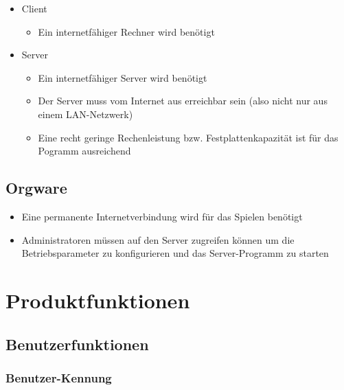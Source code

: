 \begin{itemize}
	\item Client
	\begin{itemize}
		\item Ein internetfähiger Rechner wird benötigt
	\end{itemize}
	\item Server
	\begin{itemize}
		\item Ein internetfähiger Server wird benötigt
		\item Der Server muss vom Internet aus erreichbar sein (also nicht nur aus einem LAN-Netzwerk)
		\item Eine recht geringe Rechenleistung bzw. Festplattenkapazität ist für das Pogramm ausreichend
	\end{itemize}
\end{itemize}

\section{Orgware}

\begin{itemize}
	\item Eine permanente Internetverbindung wird für das Spielen benötigt
	\item Administratoren müssen auf den Server zugreifen können um die Betriebsparameter zu konfigurieren und das Server-Programm zu starten
\end{itemize}



\chapter{Produktfunktionen}

\section{Benutzerfunktionen}

\subsection{Benutzer-Kennung}

